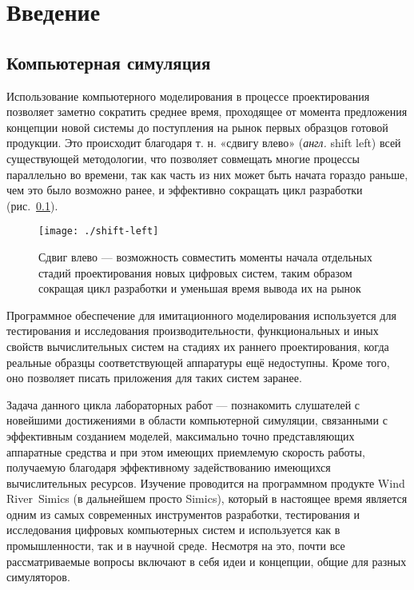 \chapter*{Введение}\label{chap:overview}

\section{Компьютерная симуляция}

Использование компьютерного моделирования в процессе проектирования позволяет заметно сократить  среднее время, проходящее от момента предложения концепции новой системы до поступления на рынок первых образцов готовой продукции. Это происходит благодаря т. н. «сдвигу влево» (\textit{англ.} shift left) всей существующей методологии, что позволяет совмещать многие процессы параллельно во времени, так как часть из них может быть начата гораздо раньше, чем это было возможно ранее, и эффективно сокращать цикл разработки (рис.~\ref{fig:shift-left}).

\begin{figure}[htb]
    \centering
    \texttt{[image: ./shift-left]}
    \caption[Сдвиг влево]{Сдвиг влево --- возможность совместить моменты начала отдельных стадий проектирования новых цифровых систем, таким образом сокращая цикл разработки и уменьшая время вывода их на рынок}
    \label{fig:shift-left}
\end{figure}

Программное обеспечение для имитационного моделирования используется для тестирования и исследования производительности, функциональных и иных свойств вычислительных систем на стадиях их раннего проектирования, когда реальные образцы соответствующей аппаратуры ещё недоступны. Кроме того, оно позволяет писать приложения для таких систем заранее.

Задача данного цикла лабораторных работ --- познакомить слушателей с новейшими достижениями в области компьютерной симуляции, связанными с эффективным созданием моделей, максимально точно представляющих аппаратные средства и при этом имеющих приемлемую скорость работы, получаемую благодаря эффективному задействованию имеющихся вычислительных ресурсов. Изучение проводится на программном продукте Wind River\textregistered\ Simics (в дальнейшем просто Simics), который в настоящее время является одним из самых современных инструментов разработки, тестирования и исследования цифровых компьютерных систем и используется как в промышленности, так и в научной среде. Несмотря на это, почти все рассматриваемые вопросы включают в себя идеи и концепции, общие для разных симуляторов.

